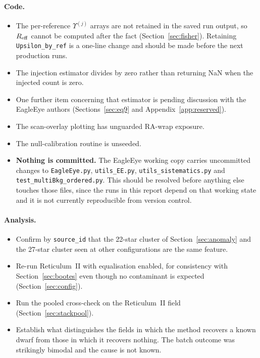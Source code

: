 \documentclass[11pt,a4paper]{article}
\newcommand{\Ups}{\Upsilon}                  %
\newcommand{\Ups}{\Upsilon}
\begin{document}
\paragraph{Code.}
\begin{itemize}[nosep,leftmargin=1.4em]
\item The per-reference $\Ups^{(j)}$ arrays are not retained in the saved run output, so
      $R_{\rm eff}$ cannot be computed after the fact (Section~\ref{sec:fisher}). Retaining
      \texttt{Upsilon\_by\_ref} is a one-line change and should be made before the next production
      runs.
\item The injection estimator divides by zero rather than returning NaN when the injected count is
      zero.
\item One further item concerning that estimator is pending discussion with the EagleEye authors
      (Sections~\ref{sec:eq9} and Appendix~\ref{app:reserved}).
\item The scan-overlay plotting has unguarded RA-wrap exposure.
\item The null-calibration routine is unseeded.
\item \textbf{Nothing is committed.} The EagleEye working copy carries uncommitted changes to
      \texttt{EagleEye.py}, \texttt{utils\_EE.py}, \texttt{utils\_sistematics.py} and
      \texttt{test\_multiBkg\_ordered.py}. This should be resolved before anything else touches
      those files, since the runs in this report depend on that working state and it is not
      currently reproducible from version control.
\end{itemize}

\paragraph{Analysis.}
\begin{itemize}[nosep,leftmargin=1.4em]
\item Confirm by \texttt{source\_id} that the 22-star cluster of Section~\ref{sec:anomaly} and the
      27-star cluster seen at other configurations are the same feature.
\item Re-run Reticulum~II with equalisation enabled, for consistency with Section~\ref{sec:bootes}
      even though no contaminant is expected (Section~\ref{sec:config}).
\item Run the pooled cross-check on the Reticulum~II field (Section~\ref{sec:stackpool}).
\item Establish what distinguishes the fields in which the method recovers a known dwarf from those
      in which it recovers nothing. The batch outcome was strikingly bimodal and the cause is not
      known.
\end{itemize}
\end{document}
